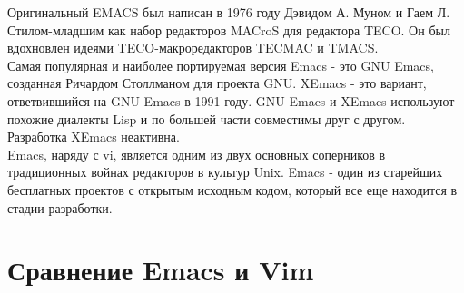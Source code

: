 Оригинальный EMACS был написан в 1976 году Дэвидом А. Муном и Гаем Л. Стилом-младшим как набор редакторов MACroS для редактора TECO. Он был вдохновлен идеями TECO-макроредакторов TECMAC и TMACS.\\

Самая популярная и наиболее портируемая версия Emacs - это GNU Emacs, созданная Ричардом Столлманом 
для проекта GNU. XEmacs - это вариант, ответвившийся на GNU Emacs в 1991 году. GNU Emacs и XEmacs
используют похожие диалекты Lisp и по большей части совместимы друг с другом. Разработка XEmacs 
неактивна.\\

Emacs, наряду с vi, является одним из двух основных соперников в традиционных войнах редакторов 
в культур Unix. Emacs - один из старейших бесплатных проектов с открытым исходным кодом, который 
все еще находится в стадии разработки.\\

\section{Сравнение Emacs и Vim}

